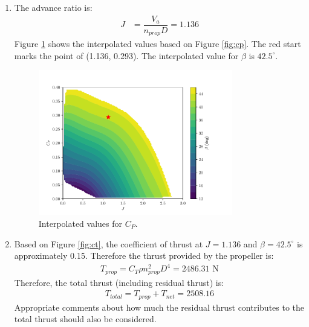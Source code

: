 \documentclass{article}
\begin{document}
\begin{enumerate}
    \item The advance ratio is:
    \begin{align*}
        J &= \dfrac{V_a}{n_{prop}D} = 1.136
    \end{align*}
    Figure \ref{fig:cp_interp} shows the interpolated values based on Figure \ref{fig:cp}. The red start marks the point of (1.136, 0.293). The interpolated value for $\beta$ is $42.5^\circ$. 

    \begin{figure}[H]
        \centering
        \includegraphics[width=0.8\textwidth]{cp_interp.pdf}
        \caption{Interpolated values for $C_P$.}
        \label{fig:cp_interp}
    \end{figure}

    \item Based on Figure \ref{fig:ct}, the coefficient of thrust at $J = 1.136$ and $\beta = 42.5^\circ$ is approximately 0.15. Therefore the thrust provided by the propeller is:
    \begin{align*}
        T_{prop} = C_T \rho n_{prop}^2 D^4 = 2486.31\text{ N}
    \end{align*}
    Therefore, the total thrust (including residual thrust) is:
    \begin{align*}
        T_{total} = T_{prop} + T_{net} = 2508.16
    \end{align*}
    Appropriate comments about how much the residual thrust contributes to the total thrust should also be considered.
\end{enumerate}
\end{document}
